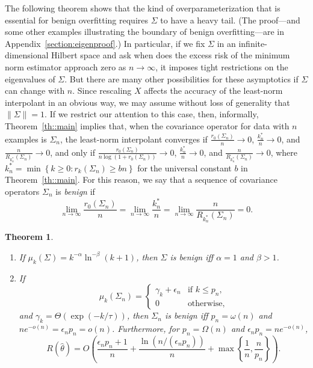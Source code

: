 \documentclass[11pt,notitlepage]{article}
\newtheorem{theorem}{Theorem}
\begin{document}
The following theorem shows that the kind of overparameterization that
is essential for benign overfitting requires $\Sigma$ to have a heavy
tail. (The proof---and some other examples illustrating the boundary of
benign overfitting---are in Appendix~\ref{section:eigenproof}.) In
particular, if we fix $\Sigma$ in an infinite-dimensional Hilbert
space and ask when does the excess risk of the minimum norm estimator
approach zero as $n\to\infty$, it imposes tight restrictions on the
eigenvalues of $\Sigma$.  But there are many other possibilities for
these asymptotics if $\Sigma$ can change with $n$.
Since rescaling $X$ affects the accuracy of the least-norm
interpolant in an obvious
way, we may assume without loss of generality that
$\| \Sigma \| = 1$.  If we restrict our attention to
this case, then, informally, 
Theorem~\ref{th::main} implies that,
when the covariance operator for data with $n$ examples
is $\Sigma_n$,
the least-norm interpolant converges if $\frac{r_0(\Sigma_n)}{n} \rightarrow 0$,
$\frac{k_n^*}{n} \rightarrow 0$, 
and $\frac{n}{R_{k_n^*}(\Sigma_n)} \rightarrow 0$,
and only if 
$\frac{r_0(\Sigma_n)}{n \log (1 + r_0(\Sigma_n))} \rightarrow 0$,
$\frac{k_n^*}{n} \rightarrow 0$, 
and $\frac{n}{R_{k_n^*}(\Sigma_n)} \rightarrow 0$,
where $k^*_n= \min\left\{k\ge 0: r_k(\Sigma_n)\ge bn\right\}$ for the
universal constant $b$ in Theorem~\ref{th::main}.
For this reason, we say that a sequence of covariance operators $\Sigma_n$ is
{\em benign} if
  \[
\lim_{n \rightarrow \infty} \frac{r_0(\Sigma_n)}{n}
 = \lim_{n \rightarrow \infty} \frac{k_n^*}{n}
 = \lim_{n \rightarrow \infty} \frac{n}{R_{k_n^*}(\Sigma_n)}
 = 0.
  \]
  \begin{theorem}\label{theorem:benign_eigenvalues}
    \mbox{}
    \begin{enumerate}
      \item\label{eigenexample:infdim}
        If $\mu_k(\Sigma) = k^{-\alpha} \ln^{-\beta} (k+1)$, then
        $\Sigma$ is benign iff $\alpha=1$ and $\beta > 1$.
      \item\label{eigenexample:expplusconst}
        If
          \[
            \mu_k(\Sigma_n) = \begin{cases}
              \gamma_k + \epsilon_n & \text{if $k\le p_n$,} \\
              0   & \text{otherwise,}
              \end{cases}
          \]
        and $\gamma_k=\Theta(\exp(-k/\tau))$,
        then $\Sigma_n$ is benign iff $p_n=\omega(n)$ and
        $ne^{-o(n)}=\epsilon_np_n=o(n)$.
        Furthermore, for $p_n=\Omega(n)$ and
        $\epsilon_np_n=ne^{-o(n)}$,
          \[
            R(\hat\theta)
              \!=\! O\left(\frac{\epsilon_np_n+1}{n}
              + \frac{\ln(n/(\epsilon_np_n))}{n}
              + \max\left\{\frac{1}{n},\frac{n}{p_n}\right\}\right).
          \]
    \end{enumerate}
  \end{theorem}
\end{document}
